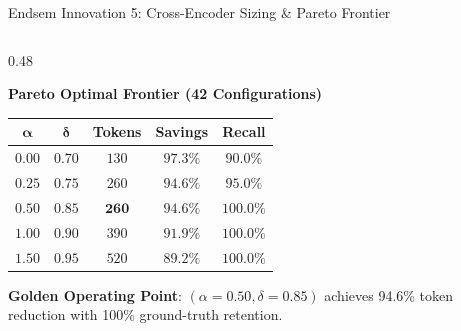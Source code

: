 \documentclass[10pt,aspectratio=169]{beamer}
\begin{document}
\begin{frame}{Endsem Innovation 5: Cross-Encoder Sizing \& Pareto Frontier}
\begin{columns}[onlytextwidth,T]
        \begin{column}{0.48\textwidth}
            \begin{alertblock}{\textbf{Pareto Optimal Frontier (42 Configurations)}}
                \scriptsize
                \begin{tabular}{ccccc}
                    \toprule
                    $\mathbf{\alpha}$ & $\mathbf{\delta}$ & \textbf{Tokens} & \textbf{Savings} & \textbf{Recall} \\
                    \midrule
                    $0.00$ & $0.70$ & $130$ & $97.3\%$ & $90.0\%$ \\
                    $0.25$ & $0.75$ & $260$ & $94.6\%$ & $95.0\%$ \\
                    $\mathbf{0.50}$ & $\mathbf{0.85}$ & $\mathbf{260}$ & $\mathbf{94.6\%}$ & $\mathbf{100.0\%}$ \\
                    $1.00$ & $0.90$ & $390$ & $91.9\%$ & $100.0\%$ \\
                    $1.50$ & $0.95$ & $520$ & $89.2\%$ & $100.0\%$ \\
                    \bottomrule
                \end{tabular}
            \end{alertblock}
            
            \vspace{-0.1cm}
            \scriptsize \textbf{Golden Operating Point}: $(\alpha = 0.50, \delta = 0.85)$ achieves 94.6\% token reduction with 100\% ground-truth retention.
        \end{column}
    \end{columns}
\end{frame}
\end{document}
